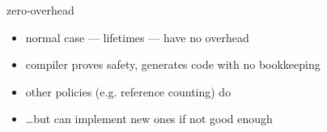 
\begin{frame}{zero-overhead}
    \begin{itemize}
    \item normal case --- lifetimes --- have no overhead
    \item compiler proves safety, generates code with no bookkeeping
        \vspace{.5cm}
    \item other policies (e.g. reference counting) do
    \item \ldots but can implement new ones if not good enough
    \end{itemize}
\end{frame}

